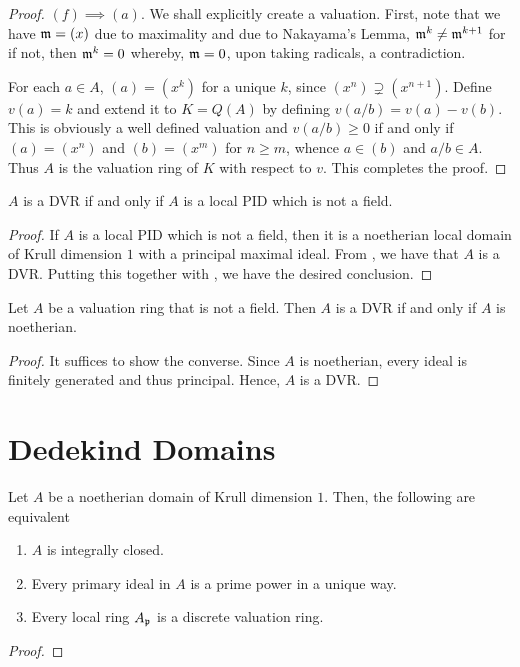 \begin{proof}
    $(f)\implies(a)$. We shall explicitly create a valuation. First, note that we have $\mathfrak m = (x)$ due to maximality and due to Nakayama's Lemma, $\mathfrak m^k\ne\mathfrak m^{k + 1}$ for if not, then $\mathfrak m^k = 0$ whereby, $\mathfrak m = 0$, upon taking radicals, a contradiction. 

    For each $a\in A$, $(a) = (x^k)$ for a unique $k$, since $(x^n)\supsetneq(x^{n + 1})$. Define $v(a) = k$ and extend it to $K = Q(A)$ by defining $v(a/b) = v(a) - v(b)$. This is obviously a well defined valuation and $v(a/b)\ge 0$ if and only if $(a) = (x^n)$ and $(b) = (x^m)$ for $n\ge m$, whence $a\in (b)$ and $a/b\in A$. Thus $A$ is the valuation ring of $K$ with respect to $v$. This completes the proof.
\end{proof}

\begin{proposition}
    $A$ is a DVR if and only if $A$ is a local PID which is not a field.
\end{proposition}
\begin{proof}
    If $A$ is a local PID which is not a field, then it is a noetherian local domain of Krull dimension $1$ with a principal maximal ideal. From , we have that $A$ is a DVR. Putting this together with , we have the desired conclusion.
\end{proof}

\begin{proposition}
    Let $A$ be a valuation ring that is not a field. Then $A$ is a DVR if and only if $A$ is noetherian.
\end{proposition}
\begin{proof}
    It suffices to show the converse. Since $A$ is noetherian, every ideal is finitely generated and thus principal. Hence, $A$ is a DVR.
\end{proof}

\section{Dedekind Domains}

\begin{theorem}
    Let $A$ be a noetherian domain of Krull dimension $1$. Then, the following are equivalent 
    \begin{enumerate}[label=(\alph*)]
        \item $A$ is integrally closed.
        \item Every primary ideal in $A$ is a prime power in a unique way.
        \item Every local ring $A_\mathfrak p$ is a discrete valuation ring.
    \end{enumerate}
\end{theorem}
\begin{proof}
\end{proof}

